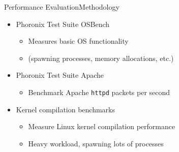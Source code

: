 \documentclass[12pt, dvipsnames, aspectratio=169]{beamer}
\begin{document}
%


\begin{frame}[c]{Performance Evaluation}{Methodology}
\begin{itemize}
    \item Phoronix Test Suite OSBench
    \begin{itemize}
        \item Measures basic OS functionality
        \item (spawning processes, memory allocations, etc.)
    \end{itemize}

    \vfill
    \item Phoronix Test Suite Apache
    \begin{itemize}
        \item Benchmark Apache \texttt{httpd} packets per second
    \end{itemize}

    \vfill
    \item Kernel compilation benchmarks
    \begin{itemize}
        \item Measure Linux kernel compilation performance
        \item Heavy workload, spawning lots of processes
    \end{itemize}
\end{itemize}
\end{frame}
\end{document}
